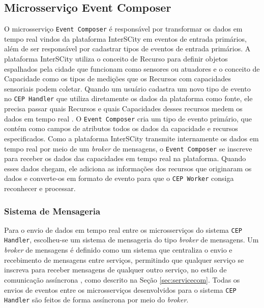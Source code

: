 \subsection{Microsserviço Event Composer} \label{sec:eventcomposer}
O microsserviço \texttt{Event Composer} é responsável por transformar os dados em tempo real vindos da plataforma InterSCity em eventos de entrada primários, além de ser responsável por cadastrar tipos de eventos de entrada primários. A plataforma InterSCity utiliza o conceito de Recurso para definir objetos espalhados pela cidade que funcionam como sensores ou atuadores e o conceito de Capacidade como os tipos de medições que os Recursos com capacidades sensoriais podem coletar. Quando um usuário cadastra um novo tipo de evento no \texttt{CEP Handler} que utiliza diretamente os dados da plataforma como fonte, ele precisa passar quais Recursos e quais Capacidades desses recursos medem os dados em tempo real%
. O \texttt{Event Composer} cria um tipo de evento primário, que contém como campos de atributos todos os dados da capacidade e recursos especificados. 
Como a plataforma InterSCity transmite internamente os dados em tempo real por meio de um \textit{broker} de mensagens, o \texttt{Event Composer} se inscreve %
para receber os dados das capacidades em tempo real na plataforma. Quando esses dados chegam, ele adiciona as informações dos recursos que originaram os dados e converte-os em formato de evento para que o \texttt{CEP Worker} consiga reconhecer e processar.

\subsubsection{Sistema de Mensageria}
\label{sec:messaging-system}
Para o envio de dados em tempo real entre os microsserviços do sistema \texttt{CEP Handler}, escolheu-se um sistema de mensageria do tipo \textit{broker} de mensagens. Um \textit{broker} de mensagens é definido como um sistema que centraliza o envio e recebimento de mensagens entre serviços, permitindo que qualquer serviço se inscreva para receber mensagens de qualquer outro serviço, no estilo de comunicação assíncrona , como descrito na Seção \ref{sec:servicecom}. Todas os envios de eventos entre os microsserviços desenvolvidos para o sistema \texttt{CEP Handler} são feitos de forma assíncrona por meio do \textit{broker}. 


